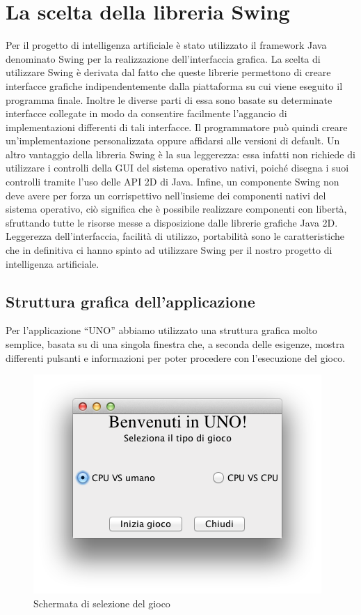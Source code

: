 \section{La scelta della libreria Swing}
	Per il progetto di intelligenza artificiale è stato utilizzato il framework Java denominato Swing per la realizzazione dell'interfaccia grafica. La scelta di utilizzare Swing è derivata dal fatto che queste librerie permettono di creare interfacce grafiche indipendentemente dalla piattaforma su cui viene eseguito il programma finale. Inoltre le diverse parti di essa sono basate su determinate interfacce collegate in modo da consentire facilmente l'aggancio di implementazioni differenti di tali interfacce. Il programmatore può quindi creare un’implementazione personalizzata oppure affidarsi alle versioni di default. 
	Un altro vantaggio della libreria Swing è la sua leggerezza: essa infatti non richiede di utilizzare i controlli della GUI del sistema operativo nativi, poiché disegna i suoi controlli tramite l'uso delle API 2D di Java. Infine, un componente Swing non deve avere per forza un corrispettivo nell'insieme dei componenti nativi del sistema operativo, ciò significa che è possibile realizzare componenti con libertà, sfruttando tutte le risorse messe a disposizione dalle librerie grafiche Java 2D. 
	Leggerezza dell'interfaccia, facilità di utilizzo, portabilità sono le caratteristiche che in definitiva ci hanno spinto ad utilizzare Swing per il nostro progetto di intelligenza artificiale. 
	
	\subsection{Struttura grafica dell'applicazione}
		Per l'applicazione “UNO” abbiamo utilizzato una struttura grafica molto semplice, basata su di una singola finestra che, a seconda delle esigenze, mostra differenti pulsanti e informazioni per poter procedere con l'esecuzione del gioco. 
		
		\begin{figure}[h]
			\centering
			\includegraphics[scale=1]{1.png}
			\caption{Schermata di selezione del gioco}
			\label{fig1}
		\end{figure}
		
